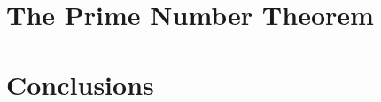 \documentclass[11pt]{report} %
\numberwithin{equation}{chapter}
\theoremstyle{definition}
\theoremstyle{remark}
\begin{document}
\chapter{The Prime Number Theorem}




\chapter{Conclusions}

\begin{appendices}

\renewcommand{\thesection}{\arabic{section}}
\renewcommand{\theequation}{A\arabic{equation}}
\renewcommand{\thetheorem}{A\arabic{theorem}}






\end{appendices}



\end{document}
